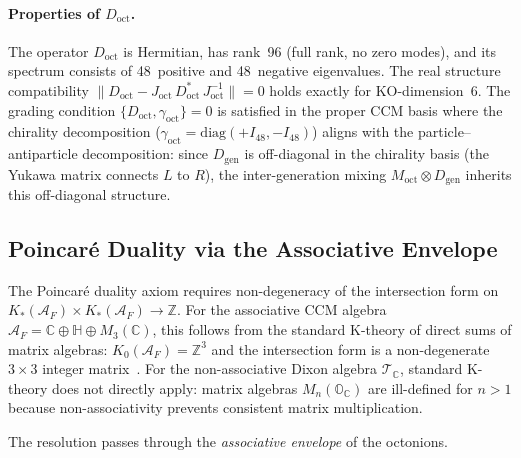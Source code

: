 \paragraph{Properties of $D_{\mathrm{oct}}$.}
The operator $D_{\mathrm{oct}}$ is Hermitian, has rank~96 (full rank, no zero modes), and its spectrum consists of 48~positive and 48~negative eigenvalues. The real structure compatibility $\|D_{\mathrm{oct}} - J_{\mathrm{oct}}\, D_{\mathrm{oct}}^*\, J_{\mathrm{oct}}^{-1}\| = 0$ holds exactly for KO-dimension~6. The grading condition $\{D_{\mathrm{oct}}, \gamma_{\mathrm{oct}}\} = 0$ is satisfied in the proper CCM basis where the chirality decomposition ($\gamma_{\mathrm{oct}} = \mathrm{diag}(+I_{48}, -I_{48})$) aligns with the particle--antiparticle decomposition: since $D_{\mathrm{gen}}$ is off-diagonal in the chirality basis (the Yukawa matrix connects $L$ to $R$), the inter-generation mixing $M_{\mathrm{oct}} \otimes D_{\mathrm{gen}}$ inherits this off-diagonal structure.


\subsection{Poincar\'{e} Duality via the Associative Envelope}
\label{sec:4-poincare}

The Poincar\'{e} duality axiom requires non-degeneracy of the intersection form on $K_*(\mathcal{A}_F) \times K_*(\mathcal{A}_F) \to \mathbb{Z}$. For the associative CCM algebra $\mathcal{A}_F = \mathbb{C} \oplus \mathbb{H} \oplus M_3(\mathbb{C})$, this follows from the standard K-theory of direct sums of matrix algebras: $K_0(\mathcal{A}_F) = \mathbb{Z}^3$ and the intersection form is a non-degenerate $3 \times 3$ integer matrix~\cite{ch4:CCM2007}. For the non-associative Dixon algebra $\mathcal{T}_{\mathbb{C}}$, standard K-theory does not directly apply: matrix algebras $M_n(\mathbb{O}_{\mathbb{C}})$ are ill-defined for $n > 1$ because non-associativity prevents consistent matrix multiplication.

The resolution passes through the \emph{associative envelope} of the octonions.

